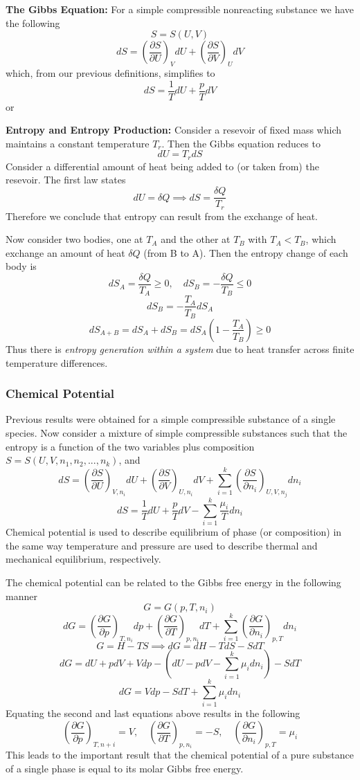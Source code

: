 \documentclass[11pt]{article}
\newcommand{\CenteredBoxed}[1]{\begin{center}\boxed{#1}\end{center}}
\newcommand{\sumlim}[2]{\sum\limits_{#1}^{#2}}
\newcommand{\Partial}[2]{\frac{\partial #1}{\partial #2}}
\newcommand{\PartialConst}[3]{\left(\Partial{#1}{#2}\right)_{#3}}
\begin{document}
\textbf{The Gibbs Equation:}
For a simple compressible nonreacting substance we have the following
$$S = S(U,V)$$
$$dS = \PartialConst{S}{U}{V}dU + \PartialConst{S}{V}{U}dV$$
which, from our previous definitions, simplifies to
$$dS = \frac{1}{T}dU + \frac{p}{T}dV$$
or
\CenteredBoxed{dU = TdS - pdV}

\textbf{Entropy and Entropy Production:}
Consider a resevoir of fixed mass which maintains a constant temperature $T_r$. Then the Gibbs equation reduces to
$$dU = T_rdS$$
Consider a differential amount of heat being added to (or taken from) the resevoir. The first law states
$$dU = \delta Q\implies dS = \frac{\delta Q}{T_r}$$
Therefore we conclude that entropy can result from the exchange of heat.

Now consider two bodies, one at $T_A$ and the other at $T_B$ with $T_A<T_B$, which exchange an amount of heat $\delta Q$ (from B to A). Then the entropy change of each body is
$$dS_A =  \frac{\delta Q}{T_A}\geq0,\quad dS_B = - \frac{\delta Q}{T_B}\leq0$$
$$dS_B = -\frac{T_A}{T_B}dS_A$$
$$dS_{A+B} = dS_A + dS_B = dS_A\left(1-\frac{T_A}{T_B}\right)\geq0$$
Thus there is \emph{entropy generation within a system} due to heat transfer across finite temperature differences.

\subsubsection{Chemical Potential}
Previous results were obtained for a simple compressible substance of a single species. Now consider a mixture of simple compressible substances such that the entropy is a function of the two variables plus composition $S = S(U,V,n_1,n_2,...,n_k)$, and
$$dS = \PartialConst{S}{U}{V,n_i}dU + \PartialConst{S}{V}{U,n_i}dV + \sumlim{i=1}{k}\PartialConst{S}{n_i}{U,V,n_j}dn_i$$
$$dS = \frac{1}{T}dU + \frac{p}{T}dV - \sumlim{i=1}{k}\frac{\mu_i}{T}dn_i$$
Chemical potential is used to describe equilibrium of phase (or composition) in the same way temperature and pressure are used to describe thermal and mechanical equilibrium, respectively.

The chemical potential can be related to the Gibbs free energy in the following manner
$$G = G(p,T,n_i)$$
$$dG = \PartialConst{G}{p}{T,n_i}dp + \PartialConst{G}{T}{p,n_i}dT + \sumlim{i=1}{k}\PartialConst{G}{n_i}{p,T}dn_i$$
$$G = H - TS \implies dG = dH - TdS - SdT $$
$$dG = dU + pdV + Vdp - \left(dU - pdV -\sumlim{i=1}{k}\mu_idn_i\right) - SdT$$
$$dG = Vdp - SdT + \sumlim{i=1}{k}\mu_idn_i$$
Equating the second and last equations above results in the following
$$\PartialConst{G}{p}{T,n+i}=V,\quad\PartialConst{G}{T}{p,n_i}=-S,\quad\PartialConst{G}{n_i}{p,T}=\mu_i$$
This leads to the important result that the chemical potential of a pure substance of a single phase is equal to its molar Gibbs free energy.
\end{document}
